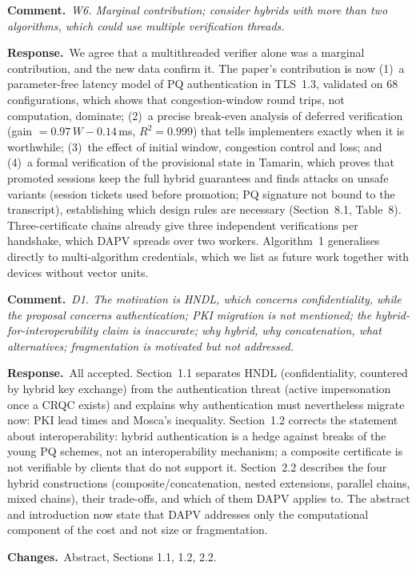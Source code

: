 \documentclass[11pt]{article}
\newcommand{\RC}[1]{\par\medskip\noindent\textcolor{rc}{\textbf{Comment.}}~\textit{#1}\par}
\newcommand{\AR}{\par\noindent\textbf{Response.}~}
\newcommand{\CH}{\par\noindent\textbf{Changes.}~}
\begin{document}
\RC{W6. Marginal contribution; consider hybrids with more than two
algorithms, which could use multiple verification threads.}
\AR We agree that a multithreaded verifier alone was a marginal
contribution, and the new data confirm it.  The paper's contribution is
now (1)~a parameter-free latency model of PQ authentication in TLS~1.3,
validated on 68 configurations, which shows that congestion-window round
trips, not computation, dominate; (2)~a precise break-even analysis of
deferred verification (gain $= 0.97\,W - 0.14$\,ms, $R^2 = 0.999$) that
tells implementers exactly when it is worthwhile; (3)~the effect of
initial window, congestion control and loss; and (4)~a formal
verification of the provisional state in Tamarin, which proves that
promoted sessions keep the full hybrid guarantees and finds attacks on
unsafe variants (session tickets used before promotion; PQ signature not
bound to the transcript), establishing which design rules are necessary
(Section~8.1, Table~8).
Three-certificate chains already give three independent verifications per
handshake, which DAPV spreads over two workers.  Algorithm~1 generalises
directly to multi-algorithm credentials, which we list as future work
together with devices without vector units.

\RC{D1. The motivation is HNDL, which concerns confidentiality, while the
proposal concerns authentication; PKI migration is not mentioned; the
hybrid-for-interoperability claim is inaccurate; why hybrid, why
concatenation, what alternatives; fragmentation is motivated but not
addressed.}
\AR All accepted.  Section~1.1 separates HNDL (confidentiality, countered
by hybrid key exchange) from the authentication threat (active
impersonation once a CRQC exists) and explains why authentication must
nevertheless migrate now: PKI lead times and Mosca's inequality.
Section~1.2 corrects the statement about interoperability: hybrid
authentication is a hedge against breaks of the young PQ schemes, not an
interoperability mechanism; a composite certificate is not verifiable by
clients that do not support it.  Section~2.2 describes the four hybrid
constructions (composite/concatenation, nested extensions, parallel
chains, mixed chains), their trade-offs, and which of them DAPV applies
to.  The abstract and introduction now state that DAPV addresses only the
computational component of the cost and not size or fragmentation.
\CH Abstract, Sections 1.1, 1.2, 2.2.
\end{document}
